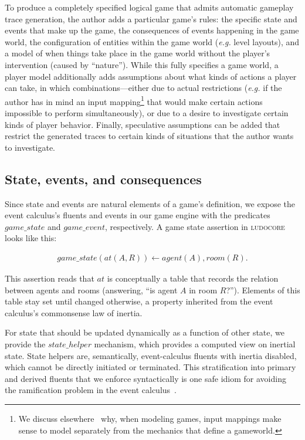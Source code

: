 \documentclass[conference]{IEEEtran}
\newcommand{\ludocore}{\textsc{ludocore}}
\newcommand{\snippet}[1]{{\vspace{-0.4cm}\begin{align*}#1\end{align*}\vspace{-0.4cm}}}
\newcommand{\logical}[1]{$#1$}
\begin{document}
To produce a completely specified logical game that admits automatic gameplay
trace generation, the author adds a particular game's rules: the specific state
and events that make up the game, the consequences of events happening in the
game world, the configuration of entities within the game world (\emph{e.g.}
level layouts), and a model of when things take place in the game world without
the player's intervention (caused by ``nature''). While this fully specifies a
game world, a player model additionally adds assumptions about what kinds of
actions a player can take, in which combinations---either due to actual
restrictions (\emph{e.g.} if the author has in mind an input
mapping\footnote{We discuss elsewhere~\citep{Nelson:Towards} why, when modeling
games, input mappings make sense to model separately from the mechanics that
define a gameworld.} that would make certain actions impossible to perform
simultaneously), or due to a desire to investigate certain kinds of player
behavior. Finally, speculative assumptions can be added that restrict the
generated traces to certain kinds of situations that the author wants to
investigate.

\subsection{State, events, and consequences}

Since state and events are natural elements of a game's definition, we expose
the event calculus's fluents and events in our game engine with the predicates
\logical{game\_state} and \logical{game\_event}, respectively.  A game state
assertion in \ludocore{} looks like this:

\snippet{game\_state(at(A,R)) \leftarrow agent(A), room(R).}

This assertion reads that \logical{at} is conceptually a table that records the
relation between agents and rooms (answering, ``is agent $A$ in room $R$?'').
Elements of this table stay set until changed otherwise, a property inherited
from the event calculus's commonsense law of inertia.

For state that should be updated dynamically as a function of other state, we
provide the \logical{state\_helper} mechanism, which provides a computed view on
inertial state. State helpers are, semantically, event-calculus fluents with
inertia disabled, which cannot be directly initiated or terminated. This
stratification into primary and derived fluents that we enforce syntactically
is one safe idiom for avoiding the ramification problem in the event
calculus~\citep{Shanahan:ramification}.
\end{document}
